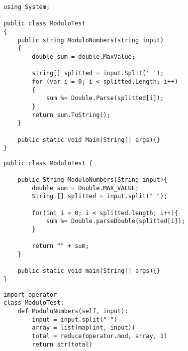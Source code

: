 	\lstset{style=sharpc}
	\begin{lstlisting}
using System;

public class ModuloTest
{
    public string ModuloNumbers(string input)
    {
        double sum = double.MaxValue;

        string[] splitted = input.Split(' ');
        for (var i = 0; i < splitted.Length; i++)
        {
            sum %= Double.Parse(splitted[i]);
        }
        return sum.ToString();
    }
	
	public static void Main(String[] args){}
}
	\end{lstlisting}

	\lstset{style=java}
	\begin{lstlisting}
public class ModuloTest {
	
	public String ModuloNumbers(String input){
		double sum = Double.MAX_VALUE;
		String [] splitted = input.split(" ");
		
		for(int i = 0; i < splitted.length; i++){
			sum %= Double.parseDouble(splitted[i]);
		}
		
		return "" + sum;
	}
	
	public static void main(String[] args){}
}

	\end{lstlisting}


	\lstset{style=python}
	\begin{lstlisting}
import operator
class ModuloTest:
    def ModuloNumbers(self, input):
        input = input.split(" ")
        array = list(map(int, input))
        total = reduce(operator.mod, array, 1)
        return str(total)
	\end{lstlisting}



